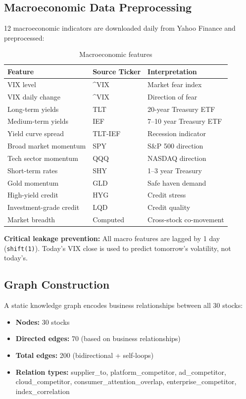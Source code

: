 \documentclass[12pt,a4paper]{article}
\begin{document}
\subsection{Macroeconomic Data Preprocessing}

12 macroeconomic indicators are downloaded daily from Yahoo Finance and preprocessed:

\begin{table}[H]
\centering
\caption{Macroeconomic features}
\begin{tabular}{lll}
\toprule
\textbf{Feature} & \textbf{Source Ticker} & \textbf{Interpretation} \\
\midrule
VIX level        & \^{}VIX  & Market fear index \\
VIX daily change & \^{}VIX  & Direction of fear \\
Long-term yields & TLT      & 20-year Treasury ETF \\
Medium-term yields & IEF    & 7--10 year Treasury ETF \\
Yield curve spread & TLT-IEF & Recession indicator \\
Broad market momentum & SPY & S\&P 500 direction \\
Tech sector momentum  & QQQ & NASDAQ direction \\
Short-term rates  & SHY     & 1--3 year Treasury \\
Gold momentum    & GLD      & Safe haven demand \\
High-yield credit & HYG    & Credit stress \\
Investment-grade credit & LQD & Credit quality \\
Market breadth   & Computed & Cross-stock co-movement \\
\bottomrule
\end{tabular}
\end{table}

\textbf{Critical leakage prevention:} All macro features are lagged by 1 day (\texttt{shift(1)}). Today's VIX close is used to predict tomorrow's volatility, not today's.

\subsection{Graph Construction}

A static knowledge graph encodes business relationships between all 30 stocks:

\begin{itemize}[noitemsep]
    \item \textbf{Nodes:} 30 stocks
    \item \textbf{Directed edges:} 70 (based on business relationships)
    \item \textbf{Total edges:} 200 (bidirectional + self-loops)
    \item \textbf{Relation types:} supplier\_to, platform\_competitor, ad\_competitor, cloud\_competitor, consumer\_attention\_overlap, enterprise\_competitor, index\_correlation
\end{itemize}
\end{document}

